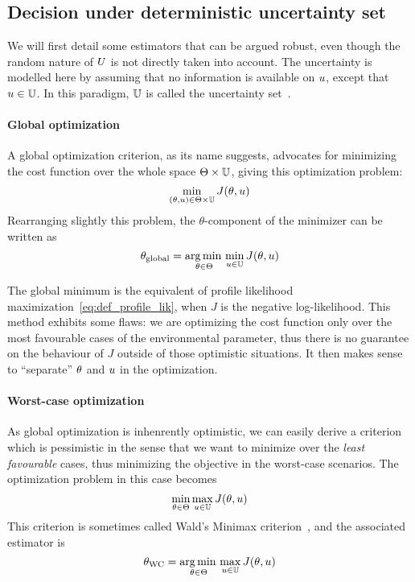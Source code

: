 \documentclass[../../Main_ManuscritThese.tex]{subfiles}
\begin{document}
\subsection{Decision under deterministic uncertainty set}
We will first detail some estimators that can be argued robust, even though the random nature of $U$ is not directly taken into account.
The uncertainty is modelled here by assuming that no information is available on $u$, except that $u \in \mathbb{U}$. In this paradigm, $\mathbb{U}$ is called the uncertainty set~\cite{bertsimas_theory_2010}.

\paragraph{Global optimization}
A global optimization criterion, as its name suggests, advocates for minimizing the cost function over the whole space $\Theta \times \mathbb{U}$, giving this optimization problem:
\begin{equation}
  \min_{(\theta,u) \in \Theta \times \mathbb{U}} J(\theta, u)
\end{equation}
Rearranging slightly this problem, the $\theta$-component of the minimizer can be written as
\begin{equation}
  \label{eq:kkglobal}
  {\theta}_{\mathrm{global}} = \operatorname*{arg\,min \,}_{\theta \in \Theta} \min_{u \in \mathbb{U}} J(\theta, u)
\end{equation}

The global minimum is the equivalent of profile likelihood maximization~\cref{eq:def_profile_lik}, when $J$ is the negative log-likelihood. This method exhibits some flaws: we are  optimizing the cost function only over the most favourable cases of the environmental parameter, thus  there is no guarantee on the behaviour of $J$ outside of those optimistic situations.
It then makes sense to ``separate'' $\theta$ and $u$ in the optimization.

\paragraph{Worst-case optimization}
\label{sec:saddle_point}
As global optimization is inhenrently optimistic, we can easily derive a criterion which is pessimistic in the sense that we want to minimize over the \emph{least favourable} cases, thus minimizing the objective in the worst-case scenarios. The optimization problem in this case becomes
\begin{equation}
  \min_{\theta\in\Theta} \max_{u \in \mathbb{U}} J(\theta,u)
\end{equation}
This criterion is sometimes called Wald's Minimax criterion~\cite{wald_statistical_1945}, and the associated estimator is
\begin{equation}
  \label{eq:kkwc}
  {\theta}_{\mathrm{WC}} =  \operatorname*{arg\,min \,}_{\theta \in \Theta} \max_{u \in \mathbb{U}} J(\theta, u)
\end{equation}
\end{document}
